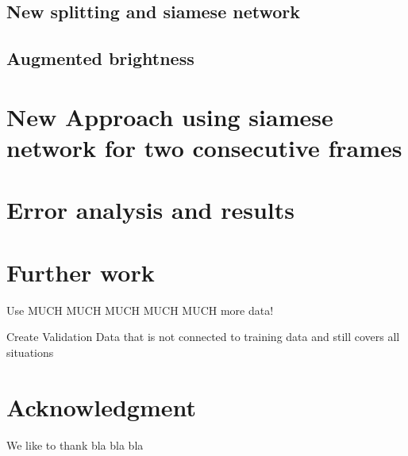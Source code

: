 \documentclass[conference]{IEEEtran}
\begin{document}
\subsection{New splitting and siamese network}

\subsection{Augmented brightness}

\section{New Approach using siamese network for two consecutive frames}


\section{Error analysis and results}

\section{Further work}

Use MUCH MUCH MUCH MUCH MUCH more data!

Create Validation Data that is not connected to training data and still covers all situations


\section*{Acknowledgment}
We like to thank bla bla bla




\printbibliography
\end{document}
